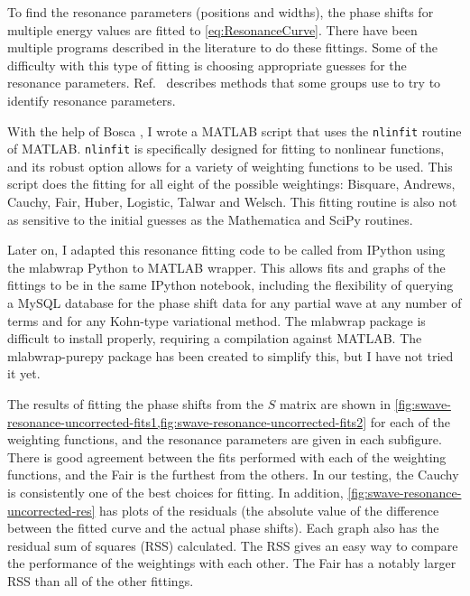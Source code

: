 \documentclass[Dissertation.tex]{subfiles}
\begin{document}
To find the resonance parameters (positions and widths), the phase shifts for 
multiple energy values are fitted to \cref{eq:ResonanceCurve}. There have 
been multiple programs described in the literature
\cite{Tennyson1984, Stibbe1998, Sochi2013} to do these fittings. %
Some of the difficulty with this type of 
fitting is choosing appropriate guesses for the resonance parameters.
Ref.~\cite{Sochi2013} describes methods that some groups use to try to identify 
resonance parameters.


With the help of Bosca \cite{BoscaPrivate}, I wrote a MATLAB\textsuperscript{\textregistered}
\cite{matlab} script that uses the \texttt{nlinfit} routine of MATLAB. 
\texttt{nlinfit} is specifically designed for fitting to nonlinear functions, 
and its robust option allows for a variety of weighting functions to be used. 
This script does the fitting for all eight of the possible weightings: 
Bisquare, Andrews, Cauchy, Fair, Huber, Logistic, Talwar and Welsch. This 
fitting routine is also not as sensitive to the initial guesses as the 
Mathematica and SciPy routines.

Later on, I adapted this resonance fitting code to be called from IPython 
\cite{ipython} using the mlabwrap \cite{mlabwrap} Python to MATLAB wrapper. 
This allows fits and graphs of the fittings to be in the same IPython 
notebook, including the flexibility of querying a MySQL database for the 
phase shift data for any partial wave at any number of terms and for
any Kohn-type variational method. The mlabwrap package is difficult to install properly, 
requiring a compilation against MATLAB. The mlabwrap-purepy package
\cite{mlabwrappurepy} has been created to simplify this, but I have not tried it 
yet.

The results of fitting the phase shifts from the $S$ matrix are shown in
\cref{fig:swave-resonance-uncorrected-fits1,fig:swave-resonance-uncorrected-fits2} 
for each of the weighting functions, and the resonance parameters are given 
in each subfigure. There is good agreement between the fits performed with 
each of the weighting functions, and the Fair is the furthest from the 
others. In our testing, the Cauchy is consistently one of the best choices 
for fitting. In addition, \cref{fig:swave-resonance-uncorrected-res} has 
plots of the residuals (the absolute value of the difference between the 
fitted curve and the actual phase shifts). Each graph also has the residual 
sum of squares (RSS) calculated. The RSS gives an easy way to compare the 
performance of the weightings with each other. The Fair has a notably larger 
RSS than all of the other fittings.
\end{document}
